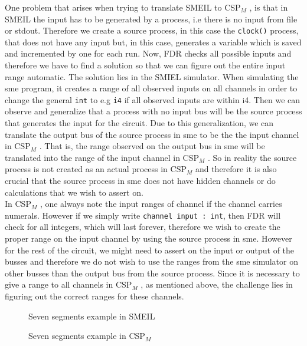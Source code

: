 \documentclass[a4paper]{report}
\newcommand{\cspm}{CSP$_M$ }
\begin{document}
One problem that arises when trying to translate SMEIL to \cspm, is that in SMEIL the input has to be generated by a process, i.e there is no input from file or stdout.
Therefore we create a source process, in this case the \texttt{clock()} process, that does not have any input but, in this case, generates a variable which is saved and incremented by one for each run.
Now, FDR checks all possible inputs and therefore we have to find a solution so that we can figure out the entire input range automatic.
The solution lies in the SMIEL simulator.
When simulating the sme program, it creates a range of all observed inputs on all channels in order to change the general \texttt{int} to e.g \texttt{i4} if all observed inputs are within i4.
Then we can observe and generalize that a process with no input bus will be the source process that generates the input for the circuit.
Due to this generalization, we can translate the output bus of the source process in sme to be the the input channel in \cspm.
That is, the range observed on the output bus in sme will be translated into the range of the input channel in \cspm.
So in reality the source process is not created as an actual process in \cspm and therefore it is also crucial that the source process in sme does not have hidden channels or do calculations that we wish to assert on. \\
In \cspm, one always note the input ranges of channel if the channel carries numerals. However if we simply write \texttt{channel input : int}, then FDR will check for all integers, which will last forever, therefore we wish to create the proper range on the input channel by using the source process in sme.
However for the rest of the circuit, we might need to assert on the input or output of the busses and therefore we do not wish to use the ranges from the sme simulator on other busses than the output bus from the source process.
Since it is necessary to give a range to all channels in \cspm, as mentioned above, the challenge lies in figuring out the correct ranges for these channels. \\

\begin{figure}
\label{seven_segments_exaple.sme}
\caption{Seven segments example in SMEIL}
\end{figure}


\begin{figure}
\label{seven_segments_exaple.csp}
\caption{Seven segments example in \cspm}
\end{figure}
\end{document}
